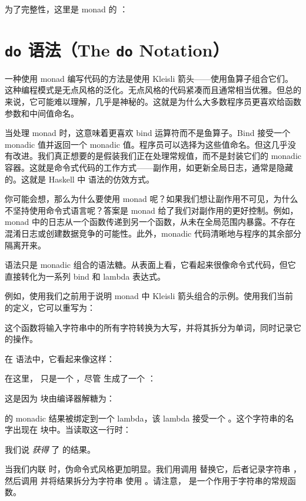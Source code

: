 为了完整性，这里是  monad 的 ：


\section{\texttt{do} 语法（The \texttt{do} Notation）}

一种使用 monad 编写代码的方法是使用 Kleisli 箭头——使用鱼算子组合它们。这种编程模式是无点风格的泛化。无点风格的代码紧凑而且通常相当优雅。但总的来说，它可能难以理解，几乎是神秘的。这就是为什么大多数程序员更喜欢给函数参数和中间值命名。

当处理 monad 时，这意味着更喜欢 bind 运算符而不是鱼算子。Bind 接受一个 monadic 值并返回一个 monadic 值。程序员可以选择为这些值命名。但这几乎没有改进。我们真正想要的是假装我们正在处理常规值，而不是封装它们的 monadic 容器。这就是命令式代码的工作方式——副作用，如更新全局日志，通常是隐藏的。这就是 Haskell 中  语法的仿效方式。

你可能会想，那么为什么要使用 monad 呢？如果我们想让副作用不可见，为什么不坚持使用命令式语言呢？答案是 monad 给了我们对副作用的更好控制。例如， monad 中的日志从一个函数传递到另一个函数，从未在全局范围内暴露。不存在混淆日志或创建数据竞争的可能性。此外，monadic 代码清晰地与程序的其余部分隔离开来。

 语法只是 monadic 组合的语法糖。从表面上看，它看起来很像命令式代码，但它直接转化为一系列 bind 和 lambda 表达式。

例如，使用我们之前用于说明  monad 中 Kleisli 箭头组合的示例。使用我们当前的定义，它可以重写为：

这个函数将输入字符串中的所有字符转换为大写，并将其拆分为单词，同时记录它的操作。

在  语法中，它看起来像这样：

在这里， 只是一个 ，尽管  生成了一个 ：

这是因为  块由编译器解糖为：

 的 monadic 结果被绑定到一个 lambda，该 lambda 接受一个 。这个字符串的名字出现在  块中。当读取这一行时：

我们说  \emph{获得} 了  的结果。

当我们内联  时，伪命令式风格更加明显。我们用调用  替换它，后者记录字符串 ，然后调用  并将结果拆分为字符串  使用 。请注意， 是一个作用于字符串的常规函数。

